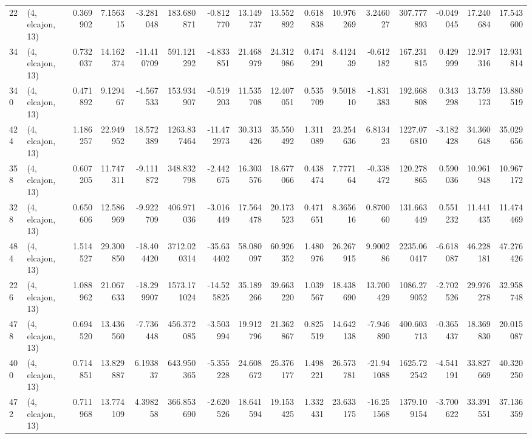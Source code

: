 \begin{tabular}{llrrrrrrrrrrrrrr}
22  &  (4, elcajon, 13) &   0.369902 &   7.156315 &  -3.281048 &   183.680871 &  -0.812770 &  13.149737 &  13.552892 &  0.618838 &  10.976269 &   3.246027 &   307.777893 & -0.049045 &  17.240684 &  17.543600 \\
34  &  (4, elcajon, 13) &   0.732037 &  14.162374 & -11.410709 &   591.121292 &  -4.833851 &  21.468979 &  24.312986 &  0.474291 &   8.412439 &  -0.612182 &   167.231815 &  0.429999 &  12.917316 &  12.931814 \\
340 &  (4, elcajon, 13) &   0.471892 &   9.129467 &  -4.567533 &   153.934907 &  -0.519203 &  11.535708 &  12.407051 &  0.535709 &   9.501810 &  -1.831383 &   192.668808 &  0.343298 &  13.759173 &  13.880519 \\
424 &  (4, elcajon, 13) &   1.186257 &  22.949952 &  18.572389 &  1263.837464 & -11.472973 &  30.313426 &  35.550492 &  1.311089 &  23.254636 &   6.813423 &  1227.076810 & -3.182428 &  34.360648 &  35.029656 \\
358 &  (4, elcajon, 13) &   0.607205 &  11.747311 &  -9.111872 &   348.832798 &  -2.442675 &  16.303576 &  18.677066 &  0.438474 &   7.777164 &  -0.338472 &   120.278865 &  0.590036 &  10.961948 &  10.967172 \\
328 &  (4, elcajon, 13) &   0.650606 &  12.586969 &  -9.922709 &   406.971036 &  -3.016449 &  17.564478 &  20.173523 &  0.471651 &   8.365616 &   0.870060 &   131.663449 &  0.551232 &  11.441435 &  11.474469 \\
484 &  (4, elcajon, 13) &   1.514527 &  29.300850 & -18.404420 &  3712.020314 & -35.634402 &  58.080097 &  60.926352 &  1.480976 &  26.267915 &   9.900286 &  2235.060417 & -6.618087 &  46.228181 &  47.276426 \\
226 &  (4, elcajon, 13) &   1.088962 &  21.067633 & -18.299907 &  1573.171024 & -14.525825 &  35.189266 &  39.663220 &  1.039567 &  18.438690 &  13.700429 &  1086.279052 & -2.702526 &  29.976278 &  32.958748 \\
478 &  (4, elcajon, 13) &   0.694520 &  13.436560 &  -7.736448 &   456.372085 &  -3.503994 &  19.912796 &  21.362867 &  0.825519 &  14.642138 &  -7.946890 &   400.603713 & -0.365437 &  18.369830 &  20.015087 \\
400 &  (4, elcajon, 13) &   0.714851 &  13.829887 &   6.193837 &   643.950365 &  -5.355228 &  24.608672 &  25.376177 &  1.498221 &  26.573781 & -21.941088 &  1625.722542 & -4.541191 &  33.827669 &  40.320250 \\
472 &  (4, elcajon, 13) &   0.711968 &  13.774109 &   4.398258 &   366.853690 &  -2.620526 &  18.641594 &  19.153425 &  1.332431 &  23.633175 & -16.251568 &  1379.109154 & -3.700622 &  33.391551 &  37.136359 \\

\end{tabular}
